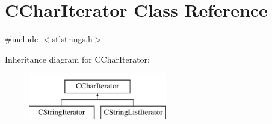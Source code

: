 \hypertarget{classCCharIterator}{\section{C\-Char\-Iterator Class Reference}
\label{classCCharIterator}
}


{\ttfamily \#include $<$stlstrings.\-h$>$}

Inheritance diagram for C\-Char\-Iterator\-:\begin{figure}[H]
\begin{center}
\leavevmode
\includegraphics[height=2.000000cm]{df/d5a/classCCharIterator}
\end{center}
\end{figure}
